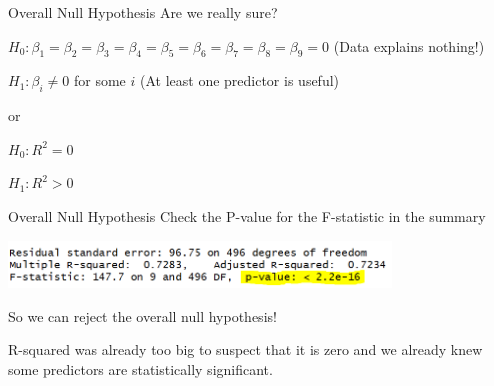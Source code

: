 \documentclass{beamer}\usepackage[]{graphicx}\usepackage[]{color}
\makeatletter
\newcommand{\hlstr}[1]{\textcolor[rgb]{1,0.894,0.71}{#1}}%
\newcommand{\hlopt}[1]{\textcolor[rgb]{1,0.894,0.769}{#1}}%
\newcommand{\hlstd}[1]{\textcolor[rgb]{1,0.894,0.769}{#1}}%
\newcommand{\hlkwc}[1]{\textcolor[rgb]{0.78,0.941,0.545}{#1}}%
\newcommand{\hlkwd}[1]{\textcolor[rgb]{1,0.78,0.769}{#1}}%
\newenvironment{kframe}{%
 \def\at@end@of@kframe{}%
 \ifinner\ifhmode%
  \def\at@end@of@kframe{\end{minipage}}%
  \begin{minipage}{\columnwidth}%
 \fi\fi%
 \def\FrameCommand##1{\hskip\@totalleftmargin \hskip-\fboxsep
 \colorbox{shadecolor}{##1}\hskip-\fboxsep
     \hskip-\linewidth \hskip-\@totalleftmargin \hskip\columnwidth}%
 \MakeFramed {\advance\hsize-\width
   \@totalleftmargin\z@ \linewidth\hsize
   \@setminipage}}%
 {\par\unskip\endMakeFramed%
 \at@end@of@kframe}
\newenvironment{knitrout}{}{} %
\makeatother
\begin{document}
\begin{darkframes}
\begin{frame}[fragile]{Overall Null Hypothesis}
      Are we really sure? \pause
      
      \bigskip
      
      $H_0: \beta_1=\beta_2=\beta_3=\beta_4=\beta_5=\beta_6=\beta_7=\beta_8=\beta_9=0$ (Data explains nothing!) \pause
      
      $H_1: \beta_i \neq 0$ for some $i$ (At least one predictor is useful) \pause
      
      \bigskip
      
      or 
      
      \bigskip
      
      $H_0: R^2=0$
      
      $H_1: R^2>0$
    \end{frame}
   
   
   
   \begin{frame}[fragile]{Overall Null Hypothesis}
      \fontsize{9}{9}\selectfont
      Check the P-value for the  F-statistic in the summary
      \begin{center}
        \includegraphics[width=4in]{r_sq_pval} \\
      \end{center}
      So we can reject the overall null hypothesis! \pause
      
      R-squared was already too big to suspect that it is zero and we already knew some predictors are statistically significant.
      
    \end{frame}  
   
   
    
\end{darkframes}
\end{document}
